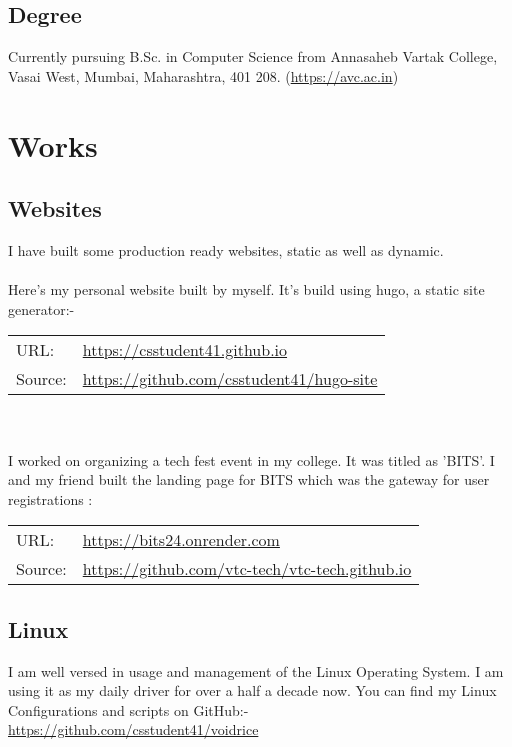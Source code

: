 \documentclass[14pt]{extarticle}
\newcommand\tab[1][1cm]{\hspace*{#1}}
\begin{document}
\subsection{Degree}
Currently pursuing B.Sc. in Computer Science from
Annasaheb Vartak College, Vasai West, Mumbai, Maharashtra, 401 208.
(\url{https://avc.ac.in})


\section{Works}

\subsection{Websites}
I have built some production ready websites, static as well as dynamic.\\
\\
Here's my personal website built by myself.
It's build using hugo, a static site generator:-\\
\begin{tabular}{l l}
	URL: & \url{https://csstudent41.github.io} \\
	Source: & \url{https://github.com/csstudent41/hugo-site} \\
\end{tabular}
\\
\\
I worked on organizing a tech fest event in my college.
It was titled as 'BITS'.
I and my friend built the landing page for BITS which was the gateway for user registrations :\\
\begin{tabular}{l l}
	URL: & \url{https://bits24.onrender.com}\\
	Source: & \url{https://github.com/vtc-tech/vtc-tech.github.io}\\
\end{tabular}

\subsection{Linux}
I am well versed in usage and management of the Linux Operating System.
I am using it as my daily driver for over a half a decade now.
You can find my Linux Configurations and scripts on GitHub:-\\
\tab \url{https://github.com/csstudent41/voidrice}
\end{document}
